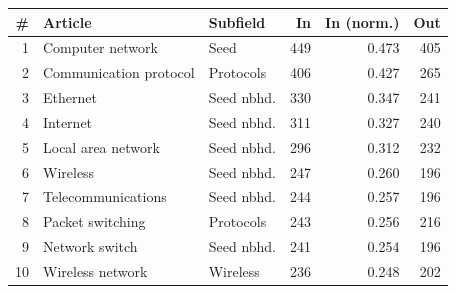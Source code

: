 
\begin{tabular}{rllrrr}
\toprule
\# & Article & Subfield & In & In (norm.) & Out\\
\midrule
1 & Computer network & Seed & 449 & 0.473 & 405\\
2 & Communication protocol & Protocols & 406 & 0.427 & 265\\
3 & Ethernet & Seed nbhd. & 330 & 0.347 & 241\\
4 & Internet & Seed nbhd. & 311 & 0.327 & 240\\
5 & Local area network & Seed nbhd. & 296 & 0.312 & 232\\
6 & Wireless & Seed nbhd. & 247 & 0.260 & 196\\
7 & Telecommunications & Seed nbhd. & 244 & 0.257 & 196\\
8 & Packet switching & Protocols & 243 & 0.256 & 216\\
9 & Network switch & Seed nbhd. & 241 & 0.254 & 196\\
10 & Wireless network & Wireless & 236 & 0.248 & 202\\
\bottomrule
\end{tabular}
